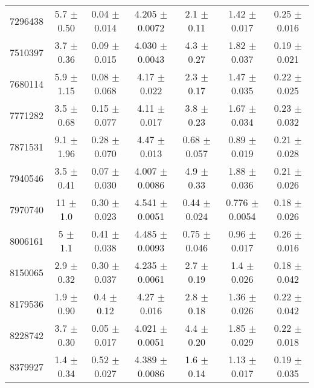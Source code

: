\documentclass[epjCONF,columns]{svjour} %
\begin{document}
\begin{table*}
\begin{tabular}{c|cccccc}
7296438  &        5.7    $\pm$  0.50   &      0.04   $\pm$  0.014  &      4.205  $\pm$  0.0072 &      2.1    $\pm$  0.11   &      1.42   $\pm$  0.017  &      0.25   $\pm$  0.016    \\
7510397  &        3.7    $\pm$  0.36   &      0.09   $\pm$  0.015  &      4.030  $\pm$  0.0043 &      4.3    $\pm$  0.27   &      1.82   $\pm$  0.037  &      0.19   $\pm$  0.021    \\
7680114  &        5.9    $\pm$  1.15   &      0.08   $\pm$  0.068  &      4.17   $\pm$  0.022  &      2.3    $\pm$  0.17   &      1.47   $\pm$  0.035  &      0.22   $\pm$  0.025    \\
7771282  &        3.5    $\pm$  0.68   &      0.15   $\pm$  0.077  &      4.11   $\pm$  0.017  &      3.8    $\pm$  0.23   &      1.67   $\pm$  0.034  &      0.23   $\pm$  0.032    \\
7871531  &        9.1    $\pm$  1.96   &      0.28   $\pm$  0.070  &      4.47   $\pm$  0.013  &      0.68   $\pm$  0.057  &      0.89   $\pm$  0.019  &      0.21   $\pm$  0.028    \\
7940546  &        3.5    $\pm$  0.41   &      0.07   $\pm$  0.030  &      4.007  $\pm$  0.0086 &      4.9    $\pm$  0.33   &      1.88   $\pm$  0.036  &      0.21   $\pm$  0.026    \\
7970740  &       11      $\pm$  1.0    &      0.30   $\pm$  0.023  &      4.541  $\pm$  0.0051 &      0.44   $\pm$  0.024  &      0.776  $\pm$  0.0054 &      0.18   $\pm$  0.026    \\
8006161  &        5      $\pm$  1.1    &      0.41   $\pm$  0.038  &      4.485  $\pm$  0.0093 &      0.75   $\pm$  0.046  &      0.96   $\pm$  0.017  &      0.26   $\pm$  0.016    \\
8150065  &        2.9    $\pm$  0.32   &      0.30   $\pm$  0.037  &      4.235  $\pm$  0.0061 &      2.7    $\pm$  0.19   &      1.4    $\pm$  0.026  &      0.18   $\pm$  0.042    \\
8179536  &        1.9    $\pm$  0.90   &      0.4    $\pm$  0.12   &      4.27   $\pm$  0.016  &      2.8    $\pm$  0.18   &      1.36   $\pm$  0.026  &      0.22   $\pm$  0.042    \\
8228742  &        3.7    $\pm$  0.30   &      0.05   $\pm$  0.017  &      4.021  $\pm$  0.0051 &      4.4    $\pm$  0.20   &      1.85   $\pm$  0.029  &      0.22   $\pm$  0.018    \\
8379927  &        1.4    $\pm$  0.34   &      0.52   $\pm$  0.027  &      4.389  $\pm$  0.0086 &      1.6    $\pm$  0.14   &      1.13   $\pm$  0.017  &      0.19   $\pm$  0.035    \\

\end{tabular}
\end{table*}
\end{document}
